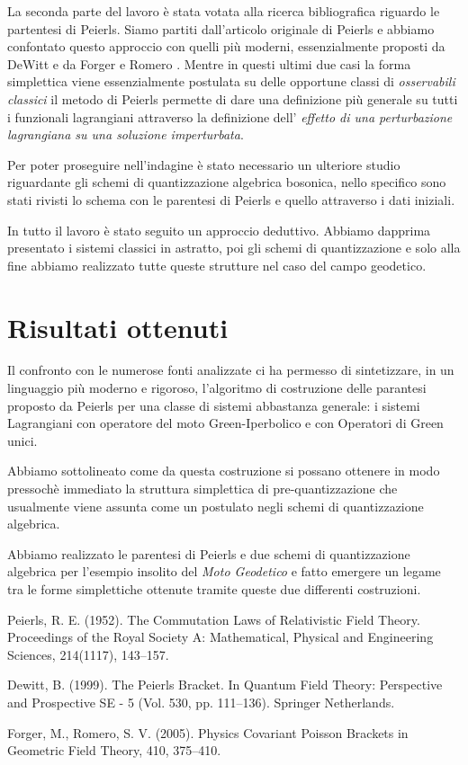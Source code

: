\documentclass[11pt]{article}
\begin{document}
La seconda parte del lavoro è stata votata alla ricerca bibliografica riguardo le partentesi di Peierls.
Siamo partiti dall'articolo originale di Peierls \cite{Peierls} e abbiamo confontato questo approccio con quelli più moderni, essenzialmente proposti da DeWitt\cite{DeWitt} e da Forger e Romero \cite{Forger}.
Mentre in questi ultimi due casi la forma simplettica viene essenzialmente postulata su delle opportune classi di \emph{osservabili classici} il metodo di Peierls permette di dare una definizione più generale su tutti i funzionali lagrangiani attraverso la definizione dell' \emph{effetto di una perturbazione lagrangiana su una soluzione imperturbata}.

Per poter proseguire nell'indagine è stato necessario un ulteriore studio riguardante gli schemi di quantizzazione algebrica bosonica, nello specifico sono stati rivisti lo schema con le parentesi di Peierls e quello attraverso i dati iniziali.

In tutto il lavoro è stato seguito un approccio deduttivo. Abbiamo dapprima presentato i sistemi classici in astratto, poi gli schemi di quantizzazione e solo alla fine abbiamo realizzato tutte queste strutture nel caso del campo geodetico.

\section{Risultati ottenuti}

Il confronto con le numerose fonti analizzate ci ha permesso di sintetizzare, in un linguaggio più moderno e rigoroso,  l'algoritmo  di costruzione  delle parantesi proposto da Peierls per una classe di sistemi abbastanza generale: i sistemi Lagrangiani con operatore del moto Green-Iperbolico e con Operatori di Green unici.

Abbiamo sottolineato come da questa costruzione si possano ottenere in modo pressochè immediato la struttura simplettica di pre-quantizzazione che usualmente viene assunta come un postulato negli schemi di quantizzazione algebrica.

Abbiamo realizzato le parentesi di Peierls e due schemi di quantizzazione algebrica per l'esempio insolito del \emph{Moto Geodetico} e fatto emergere un legame tra le forme simplettiche ottenute tramite queste due differenti costruzioni.

\begin{thebibliography}{}

   Peierls, R. E. (1952). The Commutation Laws of Relativistic Field Theory. Proceedings of the Royal Society A: Mathematical, Physical and Engineering Sciences, 214(1117), 143–157. 
	
	 Dewitt, B. (1999). The Peierls Bracket. 	In Quantum Field Theory: Perspective and Prospective SE  - 5 (Vol. 530, pp. 111–136). Springer Netherlands. 
	
	  Forger, M., Romero, S. V. (2005). Physics Covariant Poisson Brackets in Geometric Field Theory, 410, 375–410.
	
	
  \end{thebibliography}
\end{document}
